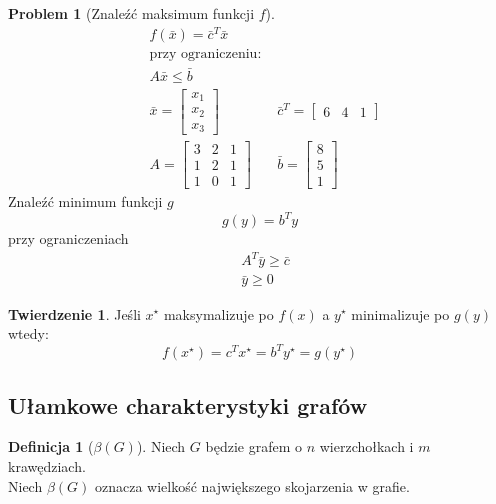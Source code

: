 \documentclass[a4paper,12pt]{article}
\theoremstyle{definition}%
\newtheorem{theorem}{Twierdzenie}%
\theoremstyle{definition}
\newtheorem{definition}{Definicja}%
\theoremstyle{problem}
\newtheorem*{problem*}{Problem}
\begin{document}
\begin{problem*}[Znaleźć maksimum funkcji $f$]
\begin{align*}
&f(\bar{x})=\bar{c}^T \bar{x}\\
&\text{przy ograniczeniu: }\\
&A\bar{x}\leq \bar{b}\\
&\bar{x} = \begin{bmatrix}
x_1\\x_2\\x_3
\end{bmatrix} & \bar{c}^T = \begin{bmatrix}
6&4&1
\end{bmatrix}\\
&A=\begin{bmatrix}
3&2&1\\1&2&1\\1&0&1
\end{bmatrix} & \bar{b}=\begin{bmatrix}
8\\5\\1
\end{bmatrix}
\end{align*}
Znaleźć minimum funkcji $g$
$$g(y)=b^Ty$$
przy ograniczeniach
\begin{align*}
&A^T\bar{y}\geq \bar{c}\\
&\bar{y} \geq 0
\end{align*}
\end{problem*}

\begin{theorem}
Jeśli $x^\star$ maksymalizuje po $f(x)$ a $y^\star$ minimalizuje po $g(y)$ wtedy:
$$f(x^\star)=c^Tx^\star =b^Ty^\star =g(y^\star)$$
\end{theorem}

\subsection{Ułamkowe charakterystyki grafów}
\begin{definition}[$\beta (G)$]
Niech $G$ będzie grafem o $n$ wierzchołkach i $m$ krawędziach.\\Niech $\beta (G)$ oznacza wielkość największego skojarzenia w grafie.
\end{definition}
\end{document}
